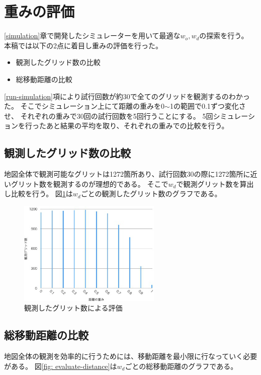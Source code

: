 \documentclass{jsarticle}
\begin{document}
\section{重みの評価}
\ref{simulation}章で開発したシミュレーターを用いて最適な$w_o,w_d$の探索を行う。
本稿では以下の2点に着目し重みの評価を行った。
\begin{itemize}
	\item 観測したグリッド数の比較
	\item 総移動距離の比較
\end{itemize}
\ref{run-simulation}項により試行回数が約30で全てのグリッドを観測するのわかった。
そこでシミュレーション上にて距離の重みを0$\sim$1の範囲で0.1ずつ変化させ、
それぞれの重みで30回の試行回数を5回行うことにする。
5回シミュレーションを行ったあと結果の平均を取り、それぞれの重みでの比較を行う。




\subsection{観測したグリッド数の比較}
\label{evaluate-observation}
地図全体で観測可能なグリットは1272箇所あり、試行回数30の際に1272箇所に近いグリット数を観測するのが理想的である。
そこで$w_d$で観測グリット数を算出し比較を行う。
図\ref{fig: evaluate-observation}は$w_d$ごとの観測したグリット数のグラフである。


\begin{figure}[tbh]
 \centering
  \includegraphics[height=50mm]{fig/evaluate-grid.eps}
  \vspace*{-4mm}
  \caption{観測したグリット数による評価}
  \label{fig: evaluate-observation}
\end{figure}


\subsection{総移動距離の比較}
\label{evaluate-distance}
地図全体の観測を効率的に行うためには、移動距離を最小限に行なっていく必要がある。
図\ref{fig: evaluate-distance}は$w_d$ごとの総移動距離のグラフである。
\end{document}
